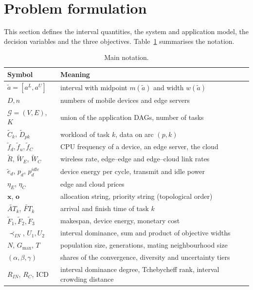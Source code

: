 \section{Problem formulation}
\label{sec:model}

This section defines the interval quantities, the system and application model, the decision variables and the three
objectives. Table~\ref{tab:notation} summarises the notation.

\begin{table}
\caption{Main notation.}
\label{tab:notation}
\footnotesize
\setlength{\tabcolsep}{4pt}
\begin{tabular}{@{}l>{\raggedright\arraybackslash}p{}@{}}
\toprule
Symbol & Meaning \\
\midrule
$\tilde a = [a^L, a^U]$ & interval with midpoint $m(\tilde a)$ and width $w(\tilde a)$ \\
$D, n$ & numbers of mobile devices and edge servers \\
$\mathcal{G} = (V, E)$, $K$ & union of the application DAGs, number of tasks \\
$\tilde C_k$, $\tilde D_{pk}$ & workload of task $k$, data on arc $(p, k)$ \\
$\tilde f_d, \tilde f_u, \tilde f_C$ & CPU frequency of a device, an edge server, the cloud \\
$\tilde R$, $\tilde W_E$, $\tilde W_C$ & wireless rate, edge--edge and edge--cloud link rates \\
$\tilde e_d$, $p_d$, $p^{idle}_d$ & device energy per cycle, transmit and idle power \\
$\eta_E$, $\eta_C$ & edge and cloud prices \\
$\mathbf{x}$, $\mathbf{o}$ & allocation string, priority string (topological order) \\
$\widetilde{AT}_k$, $\widetilde{FT}_k$ & arrival and finish time of task $k$ \\
$\tilde F_1, \tilde F_2, \tilde F_3$ & makespan, device energy, monetary cost \\
$\prec_{IN}$, $U_1, U_2$ & interval dominance, sum and product of objective widths \\
$N$, $G_{\max}$, $T$ & population size, generations, mating neighbourhood size \\
$(\alpha, \beta, \gamma)$ & shares of the convergence, diversity and uncertainty tiers \\
$R_{IN}$, $R_C$, ICD & interval dominance degree, Tchebycheff rank, interval crowding distance \\
\bottomrule
\end{tabular}
\end{table}

